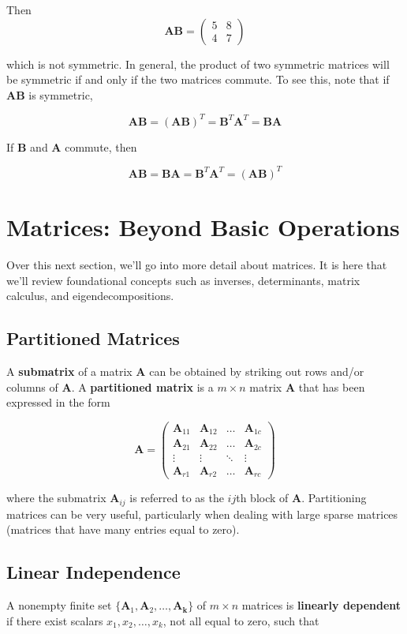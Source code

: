 \documentclass[11pt]{article}
\theoremstyle{definition}
\begin{document}
\begin{enumerate}
Then
$$\mathbf{AB} = \begin{pmatrix} 5 & 8 \\ 4 & 7\end{pmatrix} $$

which is not symmetric.  In general, the product of two symmetric matrices will be symmetric if and only if the two matrices commute.  To see this, note that if $\mathbf{AB}$ is symmetric,

$$\mathbf{AB} = \mathbf{(AB)}^T = \mathbf{B}^T\mathbf{A}^T = \mathbf{BA}$$

If $\mathbf{B}$ and $\mathbf{A}$ commute, then

$$\mathbf{AB} = \mathbf{BA} = \mathbf{B}^T\mathbf{A}^T = \mathbf{(AB)}^T $$
\end{enumerate}

\section{Matrices: Beyond Basic Operations}
Over this next section, we'll go into more detail about matrices.  It is here that we'll review foundational concepts such as inverses, determinants, matrix calculus, and eigendecompositions.

\subsection{Partitioned Matrices}
A \textbf{submatrix} of a matrix $\mathbf{A}$ can be obtained by striking out rows and/or columns of $\mathbf{A}$.  A \textbf{partitioned matrix} is a $m \times n$ matrix $\mathbf{A}$ that has been expressed in the form 

\[\mathbf{A} = 
\begin{pmatrix}
    \mathbf{A}_{11} & \mathbf{A}_{12} & \dots  & \mathbf{A}_{1c} \\
    \mathbf{A}_{21} & \mathbf{A}_{22}  & \dots  & \mathbf{A}_{2c} \\
    \vdots & \vdots  & \ddots & \vdots \\
    \mathbf{A}_{r1} & \mathbf{A}_{r2}  & \dots  & \mathbf{A}_{rc}
\end{pmatrix}
\]

where the submatrix $\mathbf{A}_{ij}$ is referred to as the $ij$th block of $\mathbf{A}$.  Partitioning matrices can be very useful, particularly when dealing with large sparse matrices (matrices that have many entries equal to zero).

\subsection{Linear Independence}
A nonempty finite set $\{\mathbf{A}_1, \mathbf{A}_2, \hdots, \mathbf{A_k}\}$ of $m \times n$ matrices is \textbf{linearly dependent} if there exist scalars $x_1, x_2, \hdots, x_k$, not all equal to zero, such that
\end{document}
